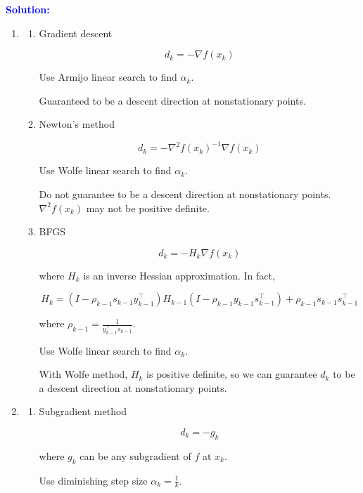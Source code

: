 \documentclass[11pt,a4paper]{article}
\newcommand{\solution}{\par\medskip
    \textcolor{blue}{\textbf{Solution:}}\par\smallskip}
\begin{document}
\solution

\begin{enumerate}
    \item[1. ]

    \begin{enumerate}
        \item[(a)] Gradient descent
        
        $$
        d_k = -\nabla f(x_k)
        $$

        Use Armijo linear search to find $\alpha_k$.

        Guaranteed to be a descent direction at nonstationary points.

        \item[(b)] Newton's method
        
        $$
        d_k = -\nabla^2 f(x_k)^{-1} \nabla f(x_k)
        $$

        Use Wolfe linear search to find $\alpha_k$.

        Do not guarantee to be a descent direction at nonstationary points. $\nabla^2 f(x_k)$ may not be positive definite.

        \item[(c)] BFGS
        
        $$
        d_k = -H_k \nabla f(x_k)
        $$

        where $H_k$ is an inverse Hessian approximation. In fact, 

        $$
        H_k = (I - \rho_{k-1} s_{k-1} y_{k-1}^\top) H_{k-1} (I - \rho_{k-1} y_{k-1} s_{k-1}^\top) + \rho_{k-1} s_{k-1} s_{k-1}^\top
        $$

        where $\rho_{k-1} = \frac{1}{y_{k-1}^\top s_{k-1}}$.

        Use Wolfe linear search to find $\alpha_k$.

        With Wolfe method, $H_k$ is positive definite, so we can guarantee $d_k$ to be a descent direction at nonstationary points.
    \end{enumerate}

    \item[2. ]
    
    \begin{enumerate}
        \item[(a)] Subgradient method
        
        $$
        d_k = -g_k
        $$

        where $g_k$ can be any subgradient of $f$ at $x_k$.

        Use diminishing step size $\alpha_k = \frac{1}{k}$.


\end{enumerate}
\end{enumerate}
\end{document}
